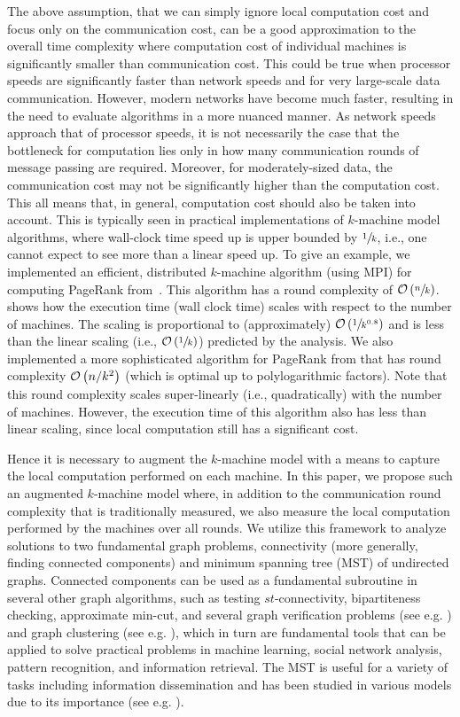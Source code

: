The above assumption, that we can simply ignore local computation cost and focus
only on the communication cost, can be a good approximation to the overall time
complexity where computation cost of individual machines is significantly smaller
than communication cost. This could be true when processor speeds are
significantly faster than network speeds and for very large-scale data
communication. However, modern networks have become much faster, resulting in
the need to evaluate algorithms in a more nuanced manner. As network speeds
approach that of processor speeds, it is not necessarily the case that the
bottleneck for computation lies only in how many communication rounds of message
passing are required. Moreover, for moderately-sized data, the communication
cost may not be significantly higher than the computation cost. This all means
that, in general, computation cost should also be taken into account. This is
typically seen in practical implementations of \(k\)-machine model algorithms,
where wall-clock time speed up is upper bounded by \(\sfrac{1}{k}\), i.e., one
cannot expect to see more than a linear speed up.  To give an example, we
implemented an efficient, distributed $k$-machine algorithm (using MPI) for
computing PageRank from~\cite{KlauckNPR15}. This algorithm has a round
complexity of \(\mathcal{O}\left(\sfrac{n}{k}\right)\).  shows how the execution
time (wall clock time) scales with respect to the number of machines. The
scaling is proportional to (approximately) \(\mathcal{O}\left(\sfrac{1}{k^{0.8}}\right)\) and is
less than the linear scaling (i.e., \(\mathcal{O}\left(\sfrac{1}{k}\right)\)) predicted by the
analysis. We also implemented a more sophisticated algorithm for PageRank from
\cite{PRS21} that has round complexity \(\mathcal{O}\left(n/k^2\right)\) (which is optimal up to
polylogarithmic factors). Note that this round complexity scales super-linearly
(i.e., quadratically) with the number of machines. However, the execution time
of this algorithm also has less than linear scaling, since local computation
still has a significant cost. 

Hence it is necessary to augment the \(k\)-machine model with a means to capture
the local computation performed on each machine. In this paper, we propose such
an augmented \(k\)-machine model where, in addition to the communication round
complexity that is traditionally measured, we also measure the local computation
performed by the machines over all rounds. We utilize this framework to analyze
solutions to two fundamental graph problems, connectivity (more generally,
finding connected components) and minimum spanning tree (MST) of undirected
graphs. Connected components can be used as a fundamental subroutine in several
other graph algorithms, such as testing $st$-connectivity, bipartiteness
checking, approximate min-cut, and several graph verification problems (see
e.g. \cite{topc18}) and graph clustering (see e.g. \cite{KiverisLMRV14}),
which in turn are fundamental tools that can be applied to solve practical problems
in machine learning, social network analysis, pattern recognition, and
information retrieval. The MST is useful for a variety of tasks including
information dissemination and has been studied in various models due to its
importance (see e.g. \cite{KlauckNPR15,AGGHSKL19,GallagerHS83}).

